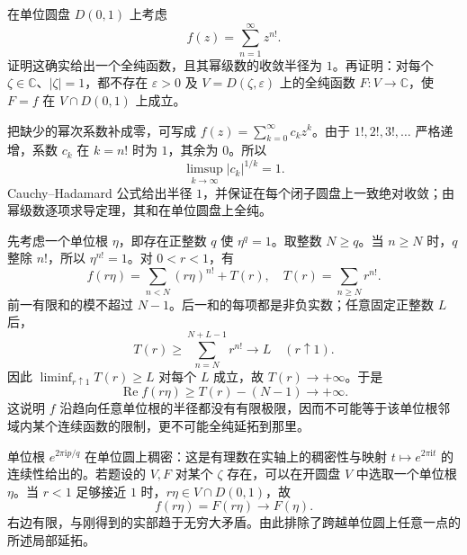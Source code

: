 \begin{optionalexercise}\label{b3:ex:01-factorial-gaps}
在单位圆盘 \(D(0,1)\) 上考虑
\[
  f(z)=\sum_{n=1}^{\infty}z^{n!}.
\]
证明这确实给出一个全纯函数，且其幂级数的收敛半径为 \(1\)。再证明：对每个 \(\zeta\in\mathbb C\)、\(|\zeta|=1\)，都不存在 \(\varepsilon>0\) 及 \(V=D(\zeta,\varepsilon)\) 上的全纯函数 \(F:V\rightarrow\mathbb C\)，使 \(F=f\) 在 \(V\cap D(0,1)\) 上成立。
\end{optionalexercise}
\begin{solution}
把缺少的幂次系数补成零，可写成 \(f(z)=\sum_{k=0}^{\infty}c_kz^k\)。由于 \(1!,2!,3!,\ldots\) 严格递增，系数 \(c_k\) 在 \(k=n!\) 时为 \(1\)，其余为 \(0\)。所以
\[
  \limsup_{k\to\infty}|c_k|^{1/k}=1.
\]
Cauchy--Hadamard 公式给出半径 \(1\)，并保证在每个闭子圆盘上一致绝对收敛；由幂级数逐项求导定理，其和在单位圆盘上全纯。

先考虑一个单位根 \(\eta\)，即存在正整数 \(q\) 使 \(\eta^q=1\)。取整数 \(N\ge q\)。当 \(n\ge N\) 时，\(q\) 整除 \(n!\)，所以 \(\eta^{n!}=1\)。对 \(0<r<1\)，有
\[
  f(r\eta)
  =\sum_{n<N}(r\eta)^{n!}+T(r),
  \quad T(r)=\sum_{n\ge N}r^{n!}.
\]
前一有限和的模不超过 \(N-1\)。后一和的每项都是非负实数；任意固定正整数 \(L\) 后，
\[
  T(r)\ge\sum_{n=N}^{N+L-1}r^{n!}
       \longrightarrow L\quad(r\uparrow1).
\]
因此 \(\liminf_{r\uparrow1}T(r)\ge L\) 对每个 \(L\) 成立，故 \(T(r)\to+\infty\)。于是
\[
  \operatorname{Re}f(r\eta)\ge T(r)-(N-1)\longrightarrow+\infty.
\]
这说明 \(f\) 沿趋向任意单位根的半径都没有有限极限，因而不可能等于该单位根邻域内某个连续函数的限制，更不可能全纯延拓到那里。

单位根 \(e^{2\pi\mathrm{i}p/q}\) 在单位圆上稠密：这是有理数在实轴上的稠密性与映射 \(t\mapsto e^{2\pi\mathrm{i}t}\) 的连续性给出的。若题设的 \(V,F\) 对某个 \(\zeta\) 存在，可以在开圆盘 \(V\) 中选取一个单位根 \(\eta\)。当 \(r<1\) 足够接近 \(1\) 时，\(r\eta\in V\cap D(0,1)\)，故
\[
  f(r\eta)=F(r\eta)\longrightarrow F(\eta).
\]
右边有限，与刚得到的实部趋于无穷大矛盾。由此排除了跨越单位圆上任意一点的所述局部延拓。
\end{solution}
